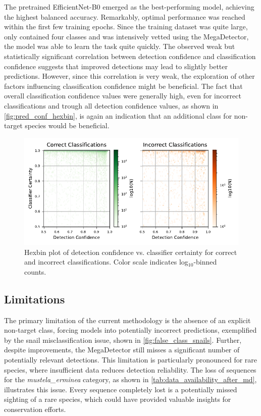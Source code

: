 The pretrained EfficientNet-B0 emerged as the best-performing model, achieving the highest balanced accuracy.
Remarkably, optimal performance was reached within the first few training epochs.
Since the training dataset was quite large, only contained four classes and was intensively vetted using the MegaDetector, the model was able to learn the task quite quickly.
The observed weak but statistically significant correlation between detection confidence and classification confidence suggests that improved detections may lead to slightly better predictions.
However, since this correlation is very weak, the exploration of other factors influencing classification confidence might be beneficial.
The fact that overall classification confidence values were generally high, even for incorrect classifications and trough all detection confidence values, as shown in \autoref{fig:pred_conf_hexbin}, is again an indication that an additional class for non-target species would be beneficial.

\begin{figure}[]
\centering
\includegraphics{figures/pred_conf_hexbin.pdf}
\caption{Hexbin plot of detection confidence vs. classifier certainty for correct and incorrect classifications. Color scale indicates log$_{10}$-binned counts.}
\label{fig:pred_conf_hexbin}
\end{figure}

\subsection{Limitations}

The primary limitation of the current methodology is the absence of an explicit non-target class, forcing models into potentially incorrect predictions, exemplified by the snail misclassification issue, shown in \autoref{fig:false_class_snails}.
Further, despite improvements, the MegaDetector still misses a significant number of potentially relevant detections.
This limitation is particularly pronounced for rare species, where insufficient data reduces detection reliability.
The loss of sequences for the \textit{mustela\_erminea} category, as shown in \autoref{tab:data_availability_after_md}, illustrates this issue.
Every sequence completely lost is a potentially missed sighting of a rare species, which could have provided valuable insights for conservation efforts.

